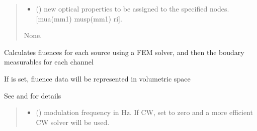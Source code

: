 \documentclass[letterpaper,10pt,english]{sphinxmanual}
\begin{document}
\begin{fulllineitems}
\begin{fulllineitems}
\begin{quote}
\begin{description}
\begin{itemize}
\item {} 
\sphinxAtStartPar
{} () \textendash{} new optical properties to be assigned to the specified nodes. {[}mua(mm\sphinxhyphen{}1) musp(mm\sphinxhyphen{}1) ri{]}.

\end{itemize}

\sphinxAtStartPar
None.

\end{description}\end{quote}

\end{fulllineitems}


\begin{fulllineitems}
\label{\detokenize{_autosummary/nirfasterff.base.stnd_mesh.stndmesh:nirfasterff.base.stnd_mesh.stndmesh.femdata}}
\pysigstartsignatures
{}
\pysigstopsignatures
\sphinxAtStartPar
Calculates fluences for each source using a FEM solver, and then the boudary measurables for each channel

\sphinxAtStartPar
If  is set, fluence data will be represented in volumetric space

\sphinxAtStartPar
See {\hyperref[\detokenize{_autosummary/nirfasterff.forward.femdata.femdata_stnd_CW:nirfasterff.forward.femdata.femdata_stnd_CW}]{}} and {\hyperref[\detokenize{_autosummary/nirfasterff.forward.femdata.femdata_stnd_FD:nirfasterff.forward.femdata.femdata_stnd_FD}]{}} for details
\begin{quote}\begin{description}
\begin{itemize}
\item {} 
\sphinxAtStartPar
{} () \textendash{} modulation frequency in Hz. If CW, set to zero and a more efficient CW solver will be used.


\end{itemize}
\end{description}
\end{quote}
\end{fulllineitems}
\end{fulllineitems}
\end{document}
